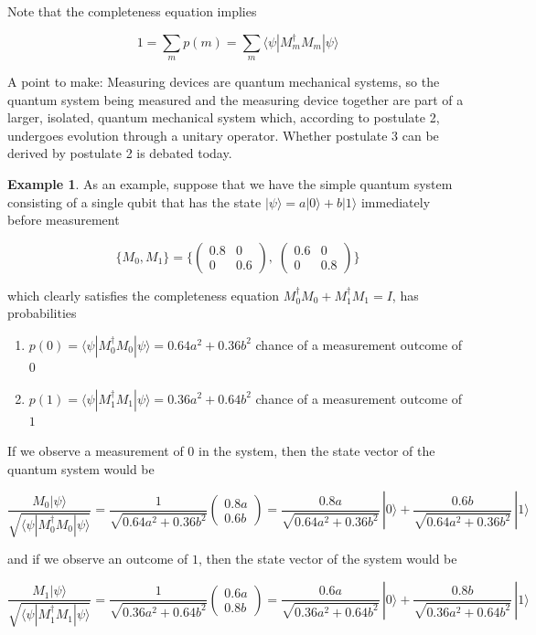 \documentclass{article}
\theoremstyle{definition}
\newtheorem{example}{Example}[section]
\begin{document}
    Note that the completeness equation implies

      \[1 = \sum_m p(m) = \sum_m \langle \psi | M_m^\dagger M_m | \psi \rangle\]

    A point to make: Measuring devices are quantum mechanical systems, so the quantum system being measured and the measuring device together are part of a larger, isolated, quantum mechanical system which, according to postulate 2, undergoes evolution through a unitary operator. Whether postulate 3 can be derived by postulate 2 is debated today.

    \begin{example}
      As an example, suppose that we have the simple quantum system consisting of a single qubit that has the state $|\psi \rangle = a|0\rangle + b|1 \rangle$ immediately before measurement

        \[\{M_0, M_1\} = \bigg\{ \begin{pmatrix} 0.8 & 0 \\  0 & 0.6 \end{pmatrix}, \; \begin{pmatrix} 0.6&0\\0&0.8 \end{pmatrix} \bigg\}\]

      which clearly satisfies the completeness equation $M_0^\dagger M_0 + M_1^\dagger M_1 = I$, has probabilities

      \begin{enumerate}
        \item $p(0) = \langle \psi | M_0^\dagger M_0 | \psi \rangle = 0.64 a^2 + 0.36b^2$ chance of a measurement outcome of $0$
        \item $p(1) = \langle \psi | M_1^\dagger M_1 | \psi \rangle = 0.36 a^2 + 0.64b^2$ chance of a measurement outcome of $1$
      \end{enumerate}

      If we observe a measurement of $0$ in the system, then the state vector of the quantum system would be

        \[\frac{M_0 | \psi\rangle}{\sqrt{\langle \psi | M_0^\dagger M_0 | \psi\rangle}} = \frac{1}{\sqrt{0.64a^2 + 0.36b^2}} \begin{pmatrix} 0.8a \\ 0.6b \end{pmatrix} = \frac{0.8a}{\sqrt{0.64a^2 + 0.36b^2}}\, |0 \rangle + \frac{0.6 b}{\sqrt{0.64a^2 + 0.36b^2}} \, |1\rangle\]

      and if we observe an outcome of $1$, then the state vector of the system would be

        \[\frac{M_1 | \psi\rangle}{\sqrt{\langle \psi | M_1^\dagger M_1 | \psi\rangle}} = \frac{1}{\sqrt{0.36a^2 + 0.64b^2}} \begin{pmatrix} 0.6a \\ 0.8b \end{pmatrix} = \frac{0.6a}{\sqrt{0.36a^2 + 0.64b^2}}\, |0 \rangle + \frac{0.8 b}{\sqrt{0.36a^2 + 0.64b^2}} \, |1\rangle\]
    \end{example}
\end{document}
